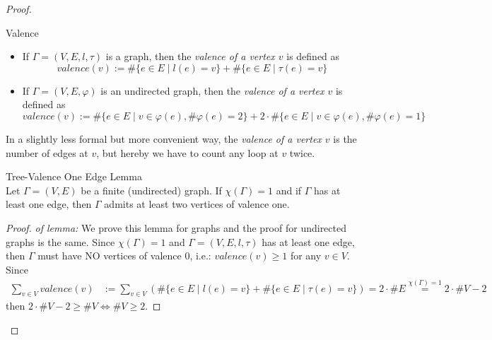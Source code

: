 \begin{proof}
    \begin{definition}{Valence}\\
    \begin{itemize}
        \item If $\Gamma= (V,E,l,\tau)$ is a graph, then the \textit{valence of a vertex $v$} is defined as
        $$valence(v):= \# \{ e \in E\mid l(e) =v \}+ \#\{e \in E\mid \tau(e)=v\}$$
        \item If $\Gamma =(V,E,\varphi)$ is an undirected graph, then the \textit{valence of a vertex $v$} is defined as
        $$valence(v):= \#\{ e\in E\mid v\in \varphi(e), \#\varphi(e)=2\} + 2\cdot \#\{ e\in E \mid v \in \varphi(e), \#\varphi(e)=1\}$$
    \end{itemize}
    In a slightly less formal but more convenient way, the \textit{valence of a vertex $v$} is the number of edges at $v$, but hereby we have to count any loop at $v$ twice.
    \end{definition}

    \begin{lemma}{Tree-Valence One Edge Lemma}\\
    Let $\Gamma=(V,E)$ be a finite (undirected) graph. If $\chi(\Gamma)=1$ and if $\Gamma$ has at least one edge, then $\Gamma$ admits at least two vertices of valence one.
    \end{lemma}

    \begin{proof}
        \textit{of lemma:} We prove this lemma for graphs and the proof for undirected graphs is the same. Since $\chi(\Gamma)=1$ and $\Gamma=(V,E,l,\tau)$ has at least one edge, then $\Gamma$ must have NO vertices of valence 0, i.e.: $valence(v) \geq 1$ for any $v\in V$. Since
        \begin{align*}
            \sum_{v \in V} valence(v) &:= \sum_{v \in V} (\#\{e\in E\mid l(e)=v\} + \#\{e \in E \mid \tau(e)=v\}) =2\cdot\#E \overset{\chi(\Gamma)=1}{=} 2 \cdot\#V-2
            \end{align*}
            then $2 \cdot \#V-2 \geq \#V \Leftrightarrow \#V\geq 2$.
    \end{proof}


\end{proof}
